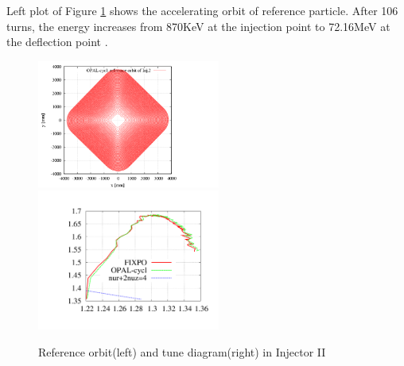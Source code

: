 Left plot of Figure \ref{fig:Inj2 reference orbit and tune} shows the accelerating orbit of reference particle. After 106 turns, the energy increases from 870KeV at
the injection point to 72.16MeV at the deflection point . 
\begin{figure}[ht]
 \begin{center} 
   \includegraphics[width=6cm,trim=2.5cm 1.0cm 2.5cm 2.5cm]{figures/cyclotron/AEO_Injector2.png}
    \includegraphics[width=6cm,trim=2.5cm 2.5cm 2.5cm 2.5cm]{figures/cyclotron/nurnuz_Inj2}
    \caption{Reference orbit(left) and tune diagram(right) in Injector II  }
    \label{fig:Inj2 reference orbit and tune}
 \end{center}
\end{figure}

